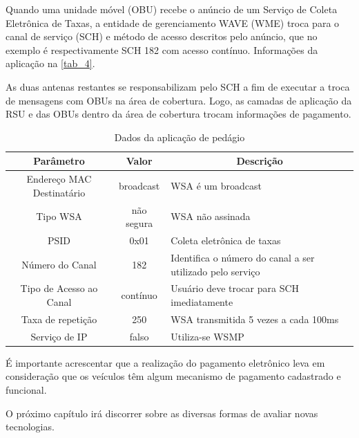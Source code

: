 \documentclass[
12pt,				%
openright,			%
oneside,			%
a4paper,			%
brazil,				%
]{abntex2}
\begin{document}
	\par Quando uma unidade móvel (OBU) recebe o anúncio de um Serviço de Coleta Eletrônica de Taxas, a entidade de gerenciamento WAVE (WME) troca para o canal de serviço (SCH) e método de acesso descritos pelo anúncio, que no exemplo é respectivamente SCH 182 com acesso contínuo. Informações da aplicação na \autoref{tab_4}.
	
	\par As duas antenas restantes se responsabilizam pelo SCH a fim de executar a troca de mensagens com OBUs na área de cobertura. Logo, as camadas de aplicação da RSU e das OBUs dentro da área de cobertura trocam informações de pagamento.
	
	
	\begin{table}[H]
		\centering
		\renewcommand{\arraystretch}{1.5}
		\begin{tabular}{|c|c|p{6cm}|} \hline
			\textbf{Parâmetro} &	\textbf{Valor} &	\multicolumn{1}{c|}{\textbf{Descrição}} \\ \hline
			Endereço MAC Destinatário & broadcast & WSA é um broadcast \\ \hline
			Tipo WSA & não segura & WSA não assinada \\ \hline
			PSID & 0x01 & Coleta eletrônica de taxas \\ \hline
			Número do Canal & 182 &	Identifica o número do canal a ser utilizado pelo serviço \\ \hline
			Tipo de Acesso ao Canal & contínuo & Usuário deve trocar para SCH imediatamente \\ \hline
			Taxa de repetição & 250 &	WSA transmitida 5 vezes a cada 100ms \\ \hline
			Serviço de IP & falso & Utiliza-se WSMP \\ \hline
		\end{tabular}	
			\caption{\label{tab_4}Dados da aplicação de pedágio}
	\end{table}			
	
	\par É importante acrescentar que a realização do pagamento eletrônico leva em consideração que os veículos têm algum mecanismo de pagamento cadastrado e funcional.

	\par O próximo capítulo irá discorrer sobre as diversas formas de avaliar novas tecnologias.

	\newpage
\end{document}
